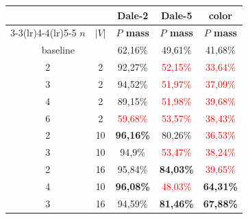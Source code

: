 \documentclass[11pt,a4paper]{article}
\begin{document}
\begin{table}[ht]
  \footnotesize
  \centering
  \begin{tabular}{cc|c|c|c}
    \toprule
                                  &           & \multicolumn{1}{c}{\textbf{Dale-2}} & \multicolumn{1}{c}{\textbf{Dale-5}} & \multicolumn{1}{c}{\textbf{color}} \\  \cmidrule(lr){3-3}\cmidrule(lr){4-4}\cmidrule(lr){5-5}
    $n$                           & $|V|$     & \textbf{$P$ mass}                   & \textbf{$P$ mass}                   & \textbf{$P$ mass}                  \\\midrule
    \multicolumn{2}{c|}{baseline} & {62,16\%} & {49,61\%}                           & {41,68\%}                                                                \\\midrule
    {2}                           & {2}       & {92,27\%}                           & \textcolor{red}{52,15\%}            & \textcolor{red}{33,64\%}           \\
    {3}                           & {2}       & {94,52\%}                           & \textcolor{red}{51,97\%}            & \textcolor{red}{37,09\%}           \\
    {4}                           & {2}       & {89,15\%}                           & \textcolor{red}{51,98\%}            & \textcolor{red}{39,68\%}           \\
    {6}                           & {2}       & \textcolor{red}{59,68\%}            & \textcolor{red}{53,57\%}            & \textcolor{red}{38,43\%}           \\
    {2}                           & {10}      & \textbf{96,16\%}                    & {80,26\%}                           & \textcolor{red}{36,53\%}           \\
    {3}                           & {10}      & {94,9\%}                            & \textcolor{red}{53,47\%}            & \textcolor{red}{38,24\%}           \\
    {2}                           & {16}      & {95,84\%}                           & \textbf{84,03\%}                    & \textcolor{red}{39,65\%}           \\
    {4}                           & {10}      & \textbf{96,08\%}                    & \textcolor{red}{48,03\%}            & \textbf{64,31\%}                   \\
    {3}                           & {16}      & {94,59\%}                           & \textbf{81,46\%}                    & \textbf{67,88\%}                   \\

\end{tabular}
\end{table}
\end{document}
